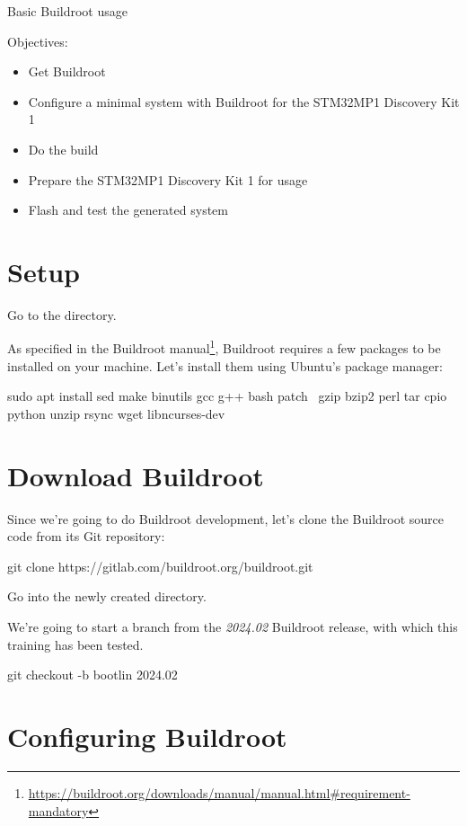 \subchapter
{Basic Buildroot usage}
{Objectives:
  \begin{itemize}
  \item Get Buildroot
  \item Configure a minimal system with Buildroot for the STM32MP1 Discovery Kit 1
  \item Do the build
  \item Prepare the STM32MP1 Discovery Kit 1 for usage
  \item Flash and test the generated system
  \end{itemize}
}

\section{Setup}

Go to the  directory.

As specified in the Buildroot
manual\footnote{\url{https://buildroot.org/downloads/manual/manual.html\#requirement-mandatory}},
Buildroot requires a few packages to be installed on your
machine. Let's install them using Ubuntu's package manager:

\begin{bashinput}
sudo apt install sed make binutils gcc g++ bash patch \
  gzip bzip2 perl tar cpio python unzip rsync wget libncurses-dev
\end{bashinput}

\section{Download Buildroot}

Since we're going to do Buildroot development, let's clone the
Buildroot source code from its Git repository:

\begin{bashinput}
git clone https://gitlab.com/buildroot.org/buildroot.git
\end{bashinput}

Go into the newly created  directory.

We're going to start a branch from the {\em 2024.02} Buildroot
release, with which this training has been tested.

\begin{bashinput}
git checkout -b bootlin 2024.02
\end{bashinput}

\section{Configuring Buildroot}

